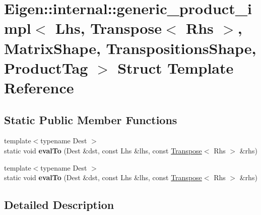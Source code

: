 \hypertarget{struct_eigen_1_1internal_1_1generic__product__impl_3_01_lhs_00_01_transpose_3_01_rhs_01_4_00_01_7e81e525eaa34bd7c41fa1e151593e72}{}\section{Eigen\+:\+:internal\+:\+:generic\+\_\+product\+\_\+impl$<$ Lhs, Transpose$<$ Rhs $>$, Matrix\+Shape, Transpositions\+Shape, Product\+Tag $>$ Struct Template Reference}
\label{struct_eigen_1_1internal_1_1generic__product__impl_3_01_lhs_00_01_transpose_3_01_rhs_01_4_00_01_7e81e525eaa34bd7c41fa1e151593e72}
\subsection*{Static Public Member Functions}
\begin{DoxyCompactItemize}
\item 
\mbox{\label{struct_eigen_1_1internal_1_1generic__product__impl_3_01_lhs_00_01_transpose_3_01_rhs_01_4_00_01_7e81e525eaa34bd7c41fa1e151593e72_a0bfd245be458b4b59c333cd17a70ed06}} 
{\footnotesize template$<$typename Dest $>$ }\\static void {\bfseries eval\+To} (Dest \&dst, const Lhs \&lhs, const \hyperlink{group___core___module_class_eigen_1_1_transpose}{Transpose}$<$ Rhs $>$ \&rhs)
\item 
\mbox{\label{struct_eigen_1_1internal_1_1generic__product__impl_3_01_lhs_00_01_transpose_3_01_rhs_01_4_00_01_7e81e525eaa34bd7c41fa1e151593e72_a0bfd245be458b4b59c333cd17a70ed06}} 
{\footnotesize template$<$typename Dest $>$ }\\static void {\bfseries eval\+To} (Dest \&dst, const Lhs \&lhs, const \hyperlink{group___core___module_class_eigen_1_1_transpose}{Transpose}$<$ Rhs $>$ \&rhs)
\end{DoxyCompactItemize}


\subsection{Detailed Description}
